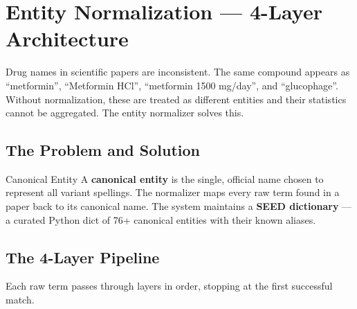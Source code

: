 \documentclass[11pt,a4paper]{article}
\begin{document}
\section{Entity Normalization --- 4-Layer Architecture}

Drug names in scientific papers are inconsistent. The same compound appears as
``metformin'', ``Metformin HCl'', ``metformin 1500 mg/day'', and ``glucophage''.
Without normalization, these are treated as different entities and their statistics
cannot be aggregated. The entity normalizer solves this.

\subsection{The Problem and Solution}

\begin{concept}{Canonical Entity}
A \textbf{canonical entity} is the single, official name chosen to represent all
variant spellings. The normalizer maps every raw term found in a paper back to its
canonical name. The system maintains a \textbf{SEED dictionary} --- a curated Python
dict of 76+ canonical entities with their known aliases.
\end{concept}

\subsection{The 4-Layer Pipeline}

Each raw term passes through layers in order, stopping at the first successful match.
\end{document}
